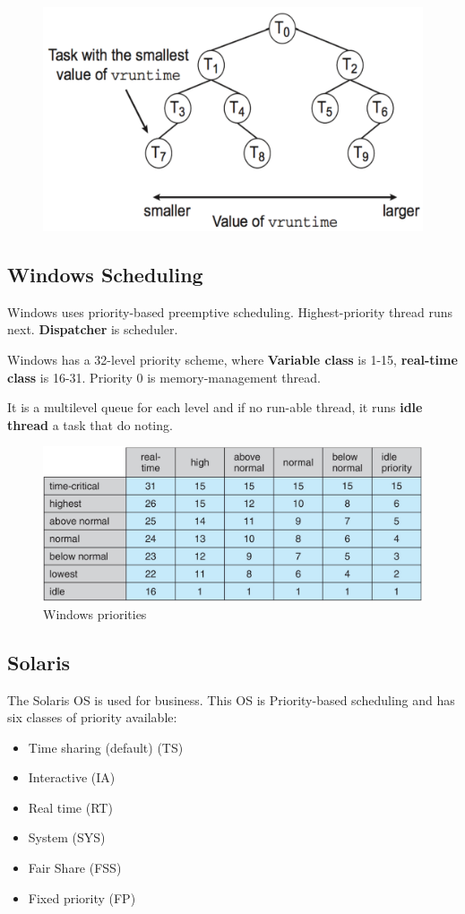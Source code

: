 \begin{figure}[htbp]
    \centering
    \includegraphics[width=0.5\linewidth]{img/btree.png}
    
    
\end{figure}


\subsection{Windows Scheduling}

Windows uses priority-based preemptive scheduling. Highest-priority thread runs next.
\textbf{Dispatcher} is scheduler.  

Windows has a 32-level priority scheme, where \textbf{Variable class} is 1-15, \textbf{real-time class} is 16-31. Priority 0 is memory-management thread.

It is a multilevel queue for each level and if no run-able thread, it runs \textbf{idle thread} a task that do noting.


\begin{figure}[htbp]
    \centering
    \includegraphics[width=0.7\linewidth]{img/WP.png}
    \caption{Windows priorities}
    
\end{figure}


\subsection{Solaris}

The Solaris OS is used for business. This OS is Priority-based scheduling and has six classes of priority available:


\begin{itemize}
    \item Time sharing (default) (TS)
    \item Interactive (IA)
    \item Real time (RT)
    \item System (SYS)
    \item Fair Share (FSS)
    \item Fixed priority (FP)
\end{itemize}

